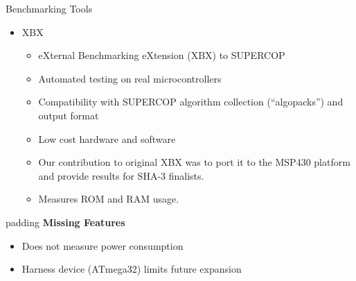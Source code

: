 \documentclass[xcolor=pdftex,dvipsnames,table,final]{beamer}
\begin{document}
\begin{frame}[fragile]{}
\begin{columns}[t, totalwidth=\textwidth]
\begin{column}{.31\linewidth}
\begin{block}{Benchmarking Tools}
        \begin{itemize}
          \item XBX
            \begin{itemize}
              \item eXternal Benchmarking eXtension (XBX) to SUPERCOP
              \item Automated testing on real microcontrollers
              \item Compatibility with SUPERCOP algorithm collection (``algopacks'') and output format
              \item Low cost hardware and software
              \item Our contribution to original XBX was to port it to the MSP430
                  platform and provide results for SHA-3 finalists.
              \item Measures ROM and RAM usage. %
            \end{itemize}
        \end{itemize}
        \begin{center}
        \begin{minipage}[t]{0.9\linewidth}  
        \begin{beamercolorbox}[rounded=true]{padding}
          \textbf{Missing Features}\small
          \begin{itemize}
            \item Does not measure power consumption
            \item Harness device (ATmega32) limits future expansion
          \end{itemize}
        \end{beamercolorbox}
        \end{minipage}
        \end{center}


\end{block}
\end{column}
\end{columns}
\end{frame}
\end{document}
